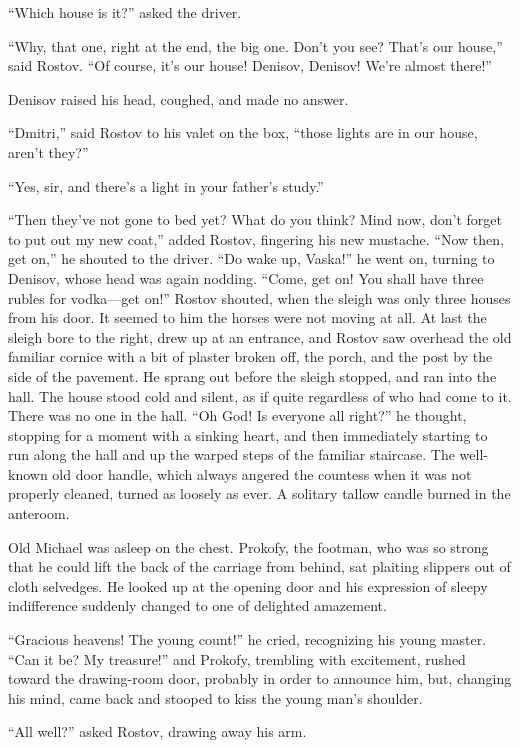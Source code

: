 ``Which house is it?'' asked the driver.

``Why, that one, right at the end, the big one. Don't you see?
That's our house,'' said Rostov. ``Of course, it's our house!
Denisov, Denisov! We're almost there!''

Denisov raised his head, coughed, and made no answer.

``Dmitri,'' said Rostov to his valet on the box, ``those lights
are in our house, aren't they?''

``Yes, sir, and there's a light in your father's study.''

``Then they've not gone to bed yet? What do you think? Mind now,
don't forget to put out my new coat,'' added Rostov, fingering
his new mustache. ``Now then, get on,'' he shouted to the
driver. ``Do wake up, Vaska!'' he went on, turning to Denisov,
whose head was again nodding.  ``Come, get on! You shall have
three rubles for vodka---get on!'' Rostov shouted, when the
sleigh was only three houses from his door. It seemed to him the
horses were not moving at all. At last the sleigh bore to the
right, drew up at an entrance, and Rostov saw overhead the old
familiar cornice with a bit of plaster broken off, the porch, and
the post by the side of the pavement. He sprang out before the
sleigh stopped, and ran into the hall. The house stood cold and
silent, as if quite regardless of who had come to it. There was
no one in the hall. ``Oh God! Is everyone all right?'' he
thought, stopping for a moment with a sinking heart, and then
immediately starting to run along the hall and up the warped
steps of the familiar staircase. The well-known old door handle,
which always angered the countess when it was not properly
cleaned, turned as loosely as ever. A solitary tallow candle
burned in the anteroom.

Old Michael was asleep on the chest. Prokofy, the footman, who
was so strong that he could lift the back of the carriage from
behind, sat plaiting slippers out of cloth selvedges. He looked
up at the opening door and his expression of sleepy indifference
suddenly changed to one of delighted amazement.

``Gracious heavens! The young count!'' he cried, recognizing his
young master. ``Can it be? My treasure!'' and Prokofy, trembling
with excitement, rushed toward the drawing-room door, probably in
order to announce him, but, changing his mind, came back and
stooped to kiss the young man's shoulder.

``All well?'' asked Rostov, drawing away his arm.

